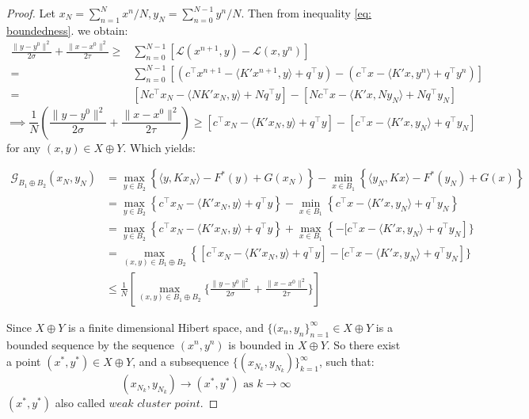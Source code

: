 \documentclass[twoside,12pt,openright]{report}  %
\begin{document}
\begin{proof}
Let \(x_N = \sum_{n=1}^{N}{x^n}/N, y_N = \sum_{n=0}^{N-1}{y^n}/N\). Then from inequality \eqref{eq: boundedness}. we obtain:
\[
\begin{aligned}
    \frac{\|y - y^{0}\|^2}{2\sigma} + \frac{\|x - x^0\|^2}{2\tau} \ge &\sum_{n=0}^{N-1} \left[\mathcal{L}(x^{n+1},y)- \mathcal{L}(x,y^n) \right]\\
    =&\sum_{n=0}^{N-1} \left[ \left( c^\top x^{n+1} - \langle K'x^{n+1}, y \rangle + q^\top y \right) 
- \left( c^\top x - \langle K'x, y^n \rangle + q^\top y^n \right) \right]\\
=& [Nc^\top x_N - \langle NK'x_N, y \rangle + Nq^\top y] - [N c^\top x - \langle K'x, Ny_N \rangle + Nq^\top y_N ]
\end{aligned}
\]
\begin{equation}
\label{eq:bounded_xNyN}
\implies \frac{1}{N}(\frac{\|y - y^{0}\|^2}{2\sigma} + \frac{\|x - x^0\|^2}{2\tau}) \ge  [c^\top x_N - \langle K'x_N, y \rangle + q^\top y] - [c^\top x - \langle K'x, y_N \rangle + q^\top y_N ]
\end{equation}
for any \((x,y) \in X \oplus Y\). Which yields:

\[
\begin{aligned}
\mathcal{G}_{B_1 \oplus B_2}(x_N,y_N) &= \max_{y \in B_2}\left\{ \langle y,Kx_N \rangle - F^*(y)+G(x_N)\right\} - \min_{x \in B_1}\left\{ \langle y_N,Kx \rangle - F^*(y_N)+G(x)\right\} \\
&= \max_{y \in B_2}\left\{ c^\top x_N - \langle K'x_N, y \rangle + q^\top y\right\} - \min_{x \in B_1}\left\{ c^\top x - \langle K'x, y_N \rangle + q^\top y_N\right\}\\
&=\max_{y \in B_2}\left\{ c^\top x_N - \langle K'x_N, y \rangle + q^\top y\right\} + \max_{x \in B_1}\left\{-[ c^\top x - \langle K'x, y_N \rangle + q^\top y_N\right]\}\\
&=\max_{(x,y) \in B_1\oplus B_2}\left\{ [c^\top x_N - \langle K'x_N, y \rangle + q^\top y] -[ c^\top x - \langle K'x, y_N \rangle + q^\top y_N\right]\}\\
&\le \frac{1}{N}[\max_{(x,y) \in B_1\oplus B_2}\{\frac{\|y - y^{0}\|^2}{2\sigma} + \frac{\|x - x^0\|^2}{2\tau}\}]
\end{aligned}
\]

Since \(X \oplus Y\) is a finite dimensional Hibert space, and \(\{(x_n,y_n\}_{n=1}^{\infty} \in X \oplus Y\) is a bounded sequence by the sequence \((x^n,y^n)\) is bounded in \(X \oplus Y\). So there exist a point \((x^*,y^*) \in X \oplus Y\), and a subsequence \(\{(x_{N_k},y_{N_k})\}_{k=1}^{\infty}\), such that: 
\[
(x_{N_k},y_{N_k}) \to (x^*,y^*) \text{ as }k\to \infty 
\]
\((x^*,y^*)\) also called \(\textit{weak cluster point}\).




\end{proof}
\end{document}
